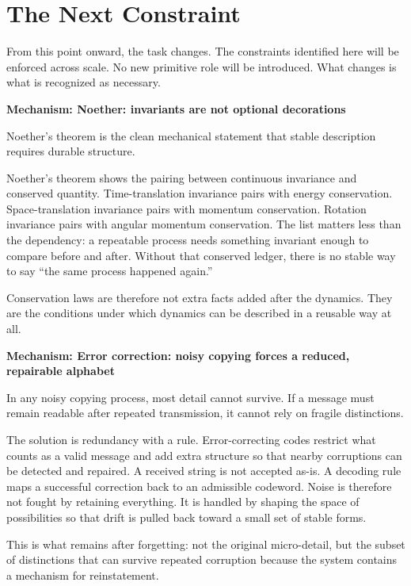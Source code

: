 \documentclass[11pt,twoside,openright]{book}
\newenvironment{mechanismbox}[1]
  {\begin{framed}\noindent\textbf{Mechanism: #1}\par\medskip}
  {\end{framed}}
\begin{document}
\section*{The Next Constraint}

From this point onward, the task changes. The constraints identified here will be enforced across scale. No new primitive role will be introduced. What changes is what is recognized as necessary.

\begin{mechanismbox}{Noether: invariants are not optional decorations}
Noether's theorem is the clean mechanical statement that stable description requires durable structure.

Noether's theorem shows the pairing between continuous invariance and conserved quantity. Time-translation invariance pairs with energy conservation. Space-translation invariance pairs with momentum conservation. Rotation invariance pairs with angular momentum conservation. The list matters less than the dependency: a repeatable process needs something invariant enough to compare before and after. Without that conserved ledger, there is no stable way to say ``the same process happened again.''

Conservation laws are therefore not extra facts added after the dynamics.
They are the conditions under which dynamics can be described in a reusable way at all.
\end{mechanismbox}
\begin{mechanismbox}{Error correction: noisy copying forces a reduced, repairable alphabet}
In any noisy copying process, most detail cannot survive.
If a message must remain readable after repeated transmission,
it cannot rely on fragile distinctions.

The solution is redundancy with a rule. Error-correcting codes restrict what counts as a valid message and add extra structure so that nearby corruptions can be detected and repaired. A received string is not accepted as-is. A decoding rule maps a successful correction back to an admissible codeword. Noise is therefore not fought by retaining everything. It is handled by shaping the space of possibilities so that drift is pulled back toward a small set of stable forms.

This is what remains after forgetting:
not the original micro-detail,
but the subset of distinctions that can survive repeated corruption
because the system contains a mechanism for reinstatement.
\end{mechanismbox}
\end{document}
